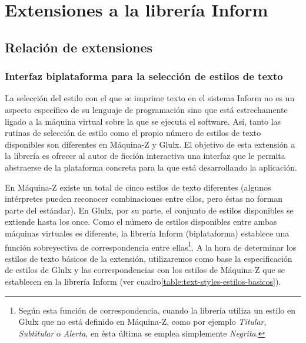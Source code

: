 
\chapter{Extensiones a la librería Inform}\label{ch:extensiones}


\section{Relación de extensiones}

\subsection{Interfaz biplataforma para la selección de estilos de texto}\label{subsec:textStyles}

La selección del estilo con el que se imprime texto en el sistema Inform no es un aspecto específico de su lenguaje de programación sino que está estrechamente ligado a la máquina virtual sobre la que se ejecuta el software. Así, tanto las rutinas de selección de estilo como el propio número de estilos de texto disponibles son diferentes en Máquina-Z y Glulx. El objetivo de esta extensión a la librería es ofrecer al autor de ficción interactiva una interfaz que le permita abstraerse de la plataforma concreta para la que está desarrollando la aplicación.

En Máquina-Z existe un total de cinco estilos de texto diferentes (algunos intérpretes pueden reconocer combinaciones entre ellos, pero éstas no forman parte del estándar)\cite{Nelson:Fillmore:2014}. En Glulx, por su parte, el conjunto de estilos disponibles se extiende hasta los once\cite{Plotkin:2017:a}. Como el número de estilos disponibles entre ambas máquinas virtuales es diferente, la librería Inform (biplataforma) establece una función sobreyectiva de correspondencia entre ellas\footnote{Según esta función de correspondencia, cuando la librería utiliza un estilo en Glulx que no está definido en Máquina-Z, como por ejemplo \emph{Titular}, \emph{Subtitular} o \emph{Alerta}, en ésta última se emplea simplemente \emph{Negrita}.}. A la hora de determinar los estilos de texto básicos de la extensión, utilizaremos como base la especificación de estilos de Glulx y las correspondencias con los estilos de Máquina-Z que se establecen en la librería Inform (ver cuadro\ref{table:text-styles-estilos-basicos}).

